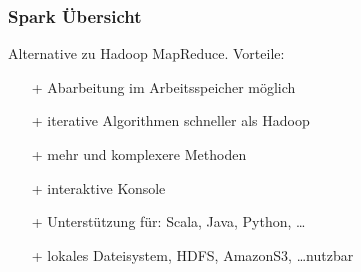 \begin{frame}
    \frametitle{Spark Übersicht}
    Alternative zu Hadoop MapReduce. Vorteile:
    \begin{itemize}
        \item[+] Abarbeitung im Arbeitsspeicher möglich %
        \item[+] iterative Algorithmen schneller als Hadoop %
        \item[+] mehr und komplexere Methoden %
        \item[+] interaktive Konsole %
        \item[+] Unterstützung für: Scala, Java, Python, \ldots
        \item[+] lokales Dateisystem, HDFS, AmazonS3, \ldots nutzbar %
    \end{itemize}
\end{frame}

